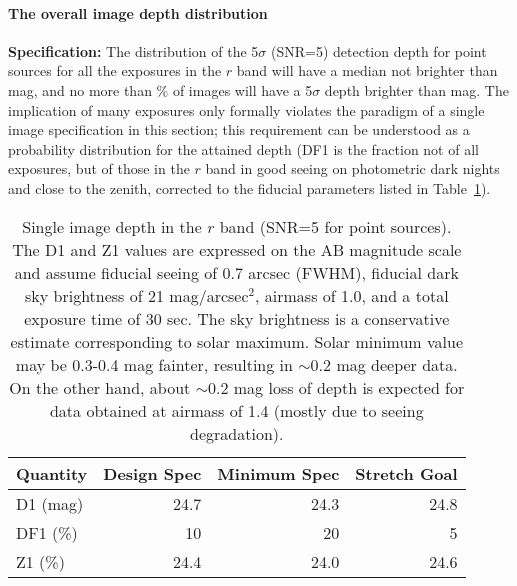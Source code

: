 \paragraph{The overall image depth distribution\\}
\label{singleimagedepth}


{\bf Specification:} The distribution of the 5$\sigma$ (SNR=5) detection
depth for point sources for all the exposures in the $r$ band will have a
median not brighter than
mag, and no more than
\% of
images will have a 5$\sigma$ depth brighter than
mag. The implication
of many exposures only formally violates the paradigm of a single image
specification in this section; this requirement can be understood as a
probability distribution for the attained depth (DF1 is the fraction
not of all exposures, but of those in the $r$ band in good seeing on photometric
dark nights and close to the zenith, corrected to the fiducial parameters
listed in Table~\ref{ImageDtable}).

\begin{table}[h]
\label{tsi}
\begin{tabular}{|l|r|r|r|}
\hline
Quantity        & Design Spec & Minimum Spec & Stretch Goal   \\
\hline
      D1 (mag)  &    24.7     &     24.3    &     24.8        \\
      DF1 (\%)  &    10       &      20     &       5         \\
      Z1  (\%)  &    24.4     &     24.0    &     24.6        \\
\hline
\end{tabular}
\caption{Single image depth in the $r$ band (SNR=5 for point sources).
The D1 and Z1 values are expressed on the AB magnitude scale
and assume 
 fiducial seeing of 0.7 arcsec (FWHM), fiducial dark sky brightness of
21 mag/arcsec$^2$, airmass of 1.0, and a total exposure time of 30 sec.
The sky brightness is a conservative estimate corresponding
to solar maximum. Solar minimum value may be 0.3-0.4 mag fainter, resulting
in $\sim$0.2 mag deeper data. On the other hand, about  $\sim$0.2 mag loss
of depth is expected for data obtained at airmass of 1.4 (mostly due to
seeing degradation). }
\label{ImageDtable}
\end{table}

